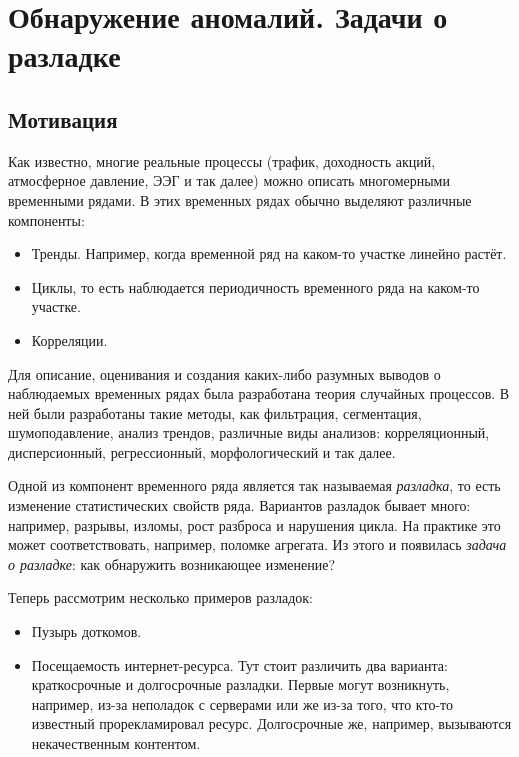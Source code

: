 \section{Обнаружение аномалий. Задачи о разладке}
\subsection{Мотивация}
Как известно, многие реальные процессы (трафик, доходность акций, атмосферное давление, ЭЭГ и так далее) можно описать многомерными временными рядами. 
В этих временных рядах обычно выделяют различные компоненты:
\begin{itemize}
	\item Тренды. 
	Например, когда временной ряд на каком-то участке линейно растёт.
	\item Циклы, то есть наблюдается периодичность временного ряда на каком-то участке.
	\item Корреляции.
\end{itemize}

Для описание, оценивания и создания каких-либо разумных выводов о наблюдаемых временных рядах была разработана теория случайных процессов. 
В ней были разработаны такие методы, как фильтрация, сегментация, шумоподавление, анализ трендов, различные виды анализов: корреляционный, дисперсионный, регрессионный, морфологический и так далее.

Одной из компонент временного ряда является так называемая \emph{разладка}, то есть изменение статистических свойств ряда. 
Вариантов разладок бывает много: например, разрывы, изломы, рост разброса и нарушения цикла. 
На практике это может соответствовать, например, поломке агрегата. 
Из этого и появилась \emph{задача о разладке}: как обнаружить возникающее изменение?

Теперь рассмотрим несколько примеров разладок:
\begin{itemize}
	\item Пузырь доткомов. %
	\item Посещаемость интернет-ресурса. 
	Тут стоит различить два варианта: краткосрочные и долгосрочные разладки. 
	Первые могут возникнуть, например, из-за неполадок с серверами или же из-за того, что кто-то известный прорекламировал ресурс. 
	Долгосрочные же, например, вызываются некачественным контентом.
\end{itemize}

